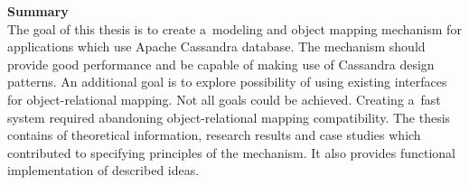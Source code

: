  \textbf{Summary} \\
 
  The goal of this thesis is to create a~modeling and object mapping mechanism for applications which use Apache Cassandra database. The mechanism should provide good performance and be capable of making use of Cassandra design patterns. An additional goal is to explore possibility of using existing interfaces for object-relational mapping. Not all goals could be achieved. Creating a~fast system required abandoning object-relational mapping compatibility. The thesis contains of theoretical information, research results and case studies which contributed to specifying principles of the mechanism. It also provides functional implementation of described ideas.
 
